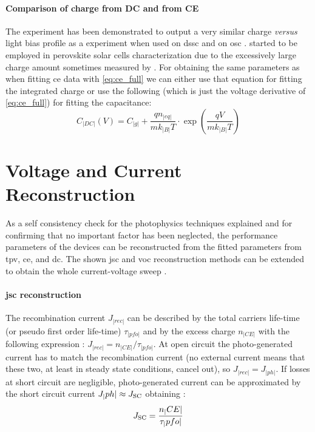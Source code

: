 	\paragraph{Comparison of charge from DC and from CE}
	The  experiment has been demonstrated to output a very similar charge \textsl{versus} light bias profile as a  experiment when used on \gls{dssc} \cite{ORegan2005,Barnes2013} and on \gls{osc} \cite{Shuttle2008a}.
	 started to be employed in perovskite solar cells characterization due to the excessively large charge amount sometimes measured by  \cite{Wheeler2017,ORegan2015b}.
	For obtaining the same parameters as when fitting \gls{ce} data with \cref{eq:ce_full} we can either use that equation for fitting the integrated charge or use the following (which is just the voltage derivative of \cref{eq:ce_full}) for fitting the capacitance:
	\begin{equation}\label{eq:dc_full}
				C_|DC|(V) = C_|g| + \frac{qn_|eq|}{mk_|B|T} \cdot \exp(\frac{qV}{mk_|B|T})
	\end{equation}

\FloatBarrier
\newpage
\section{Voltage and Current Reconstruction}
As a self consistency check for the photophysics techniques explained and for confirming that no important factor has been neglected, the performance parameters of the devices can be reconstructed from the fitted parameters from \gls{tpv}, \gls{ce}, and \gls{dc}.
The shown \gls{jsc} and \gls{voc} reconstruction methods can be extended to obtain the whole current-voltage sweep \cite{Maurano2011}.

\paragraph{\Gls{jsc} reconstruction}
The recombination current $J_|rec|$ can be described by the total carriers life\hyp{}time (or pseudo first order life\hyp{}time) $\tau_|pfo|$ and by the excess charge $n_|CE|$ with the following expression \cite{Wheeler2017,Du2018}: $J_|rec| = n_|CE| / \tau_|pfo|$.
At open circuit the photo\hyp{}generated current has to match the recombination current (no external current means that these two, at least in steady state conditions, cancel out), so $J_|rec| = J_|ph|$.
If losses at short circuit are negligible, photo\hyp{}generated current can be approximated by the short circuit current $J_|ph| \approx J_\mathrm{SC}$ obtaining \cite{ORegan2015b}:
\begin{equation}\label{eq:reconstruction_jsc}
J_\mathrm{SC} = \frac{n_|CE|}{\tau_|pfo|}
\end{equation}

